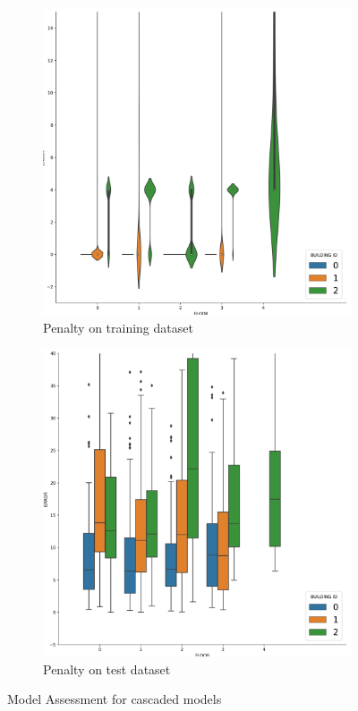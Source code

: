 \documentclass[a4paper,singleside,12pt]{report} %
\begin{document}
			\begin{figure}[!htb]
			  \centering
			  \begin{subfigure}[b]{0.48\linewidth}
			    \includegraphics[width=\linewidth]{./figures/penalty_train.png}
			     \caption{Penalty on training dataset}
			  \end{subfigure}
			  \begin{subfigure}[b]{0.48\linewidth}
			    \includegraphics[width=\linewidth]{./figures/penalty_test.png}
			    \caption{Penalty on test dataset}
			  \end{subfigure}
			  \caption{Model Assessment for cascaded models}
			  \label{fig5.15}
			\end{figure}
\end{document}
